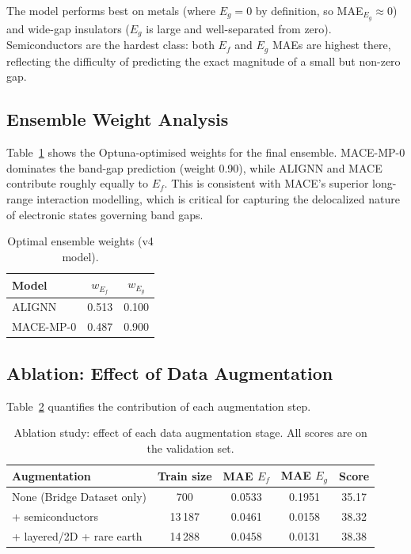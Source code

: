 \documentclass[10pt, a4paper]{article}
\begin{document}
The model performs best on metals (where $E_g = 0$ by definition,
so MAE$_{E_g} \approx 0$) and wide-gap insulators ($E_g$ is large and
well-separated from zero).
Semiconductors are the hardest class: both $E_f$ and $E_g$ MAEs are
highest there, reflecting the difficulty of predicting the exact
magnitude of a small but non-zero gap.

\subsection{Ensemble Weight Analysis}

Table~\ref{tab:weights} shows the Optuna-optimised weights for the
final ensemble.
MACE-MP-0 dominates the band-gap prediction (weight 0.90), while
ALIGNN and MACE contribute roughly equally to $E_f$.
This is consistent with MACE's superior long-range interaction modelling,
which is critical for capturing the delocalized nature of electronic
states governing band gaps.

\begin{table}[h!]
\centering
\caption{Optimal ensemble weights (v4 model).}
\label{tab:weights}
\begin{tabular}{@{}lcc@{}}
\toprule
Model & $w_{E_f}$ & $w_{E_g}$ \\
\midrule
ALIGNN   & 0.513 & 0.100 \\
MACE-MP-0 & 0.487 & 0.900 \\
\bottomrule
\end{tabular}
\end{table}

\subsection{Ablation: Effect of Data Augmentation}

Table~\ref{tab:ablation} quantifies the contribution of each
augmentation step.

\begin{table}[h!]
\centering
\caption{Ablation study: effect of each data augmentation stage.
  All scores are on the validation set.}
\label{tab:ablation}
\begin{tabular}{@{}lcccc@{}}
\toprule
Augmentation & Train size & MAE $E_f$ & MAE $E_g$ & Score \\
\midrule
None (Bridge Dataset only)  & 700   & 0.0533 & 0.1951 & 35.17 \\
+ semiconductors            & 13\,187 & 0.0461 & 0.0158 & 38.32 \\
+ layered/2D + rare earth   & 14\,288 & 0.0458 & 0.0131 & 38.38 \\
\bottomrule
\end{tabular}
\end{table}
\end{document}
